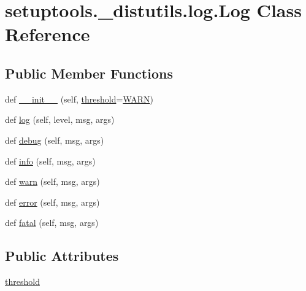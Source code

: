 \hypertarget{classsetuptools_1_1__distutils_1_1log_1_1Log}{}\section{setuptools.\+\_\+distutils.\+log.\+Log Class Reference}
\label{classsetuptools_1_1__distutils_1_1log_1_1Log}
\subsection*{Public Member Functions}
\begin{DoxyCompactItemize}
\item 
def \hyperlink{classsetuptools_1_1__distutils_1_1log_1_1Log_aa463139c235866e6ef08ccbd15c53fb9}{\+\_\+\+\_\+init\+\_\+\+\_\+} (self, \hyperlink{classsetuptools_1_1__distutils_1_1log_1_1Log_a790f5af911e8c0cdc23e0e8e595e491c}{threshold}=\hyperlink{namespacesetuptools_1_1__distutils_1_1log_a5fbf1710825f106a7c3ba1e983a66d9c}{W\+A\+RN})
\item 
def \hyperlink{classsetuptools_1_1__distutils_1_1log_1_1Log_a251202ca123680b9b576e230dfd14be0}{log} (self, level, msg, args)
\item 
def \hyperlink{classsetuptools_1_1__distutils_1_1log_1_1Log_a31b76052c8971f69f05cab006d1ffa9b}{debug} (self, msg, args)
\item 
def \hyperlink{classsetuptools_1_1__distutils_1_1log_1_1Log_a3efdeec8a2d9073588273d997cdb0093}{info} (self, msg, args)
\item 
def \hyperlink{classsetuptools_1_1__distutils_1_1log_1_1Log_a172491674ea9d884bfd6822c7394171b}{warn} (self, msg, args)
\item 
def \hyperlink{classsetuptools_1_1__distutils_1_1log_1_1Log_a0fbeec490b13d1d7746af336ad946234}{error} (self, msg, args)
\item 
def \hyperlink{classsetuptools_1_1__distutils_1_1log_1_1Log_a40e5245c1fa073d1c42a2a34330bfbee}{fatal} (self, msg, args)
\end{DoxyCompactItemize}
\subsection*{Public Attributes}
\begin{DoxyCompactItemize}
\item 
\hyperlink{classsetuptools_1_1__distutils_1_1log_1_1Log_a790f5af911e8c0cdc23e0e8e595e491c}{threshold}
\end{DoxyCompactItemize}


